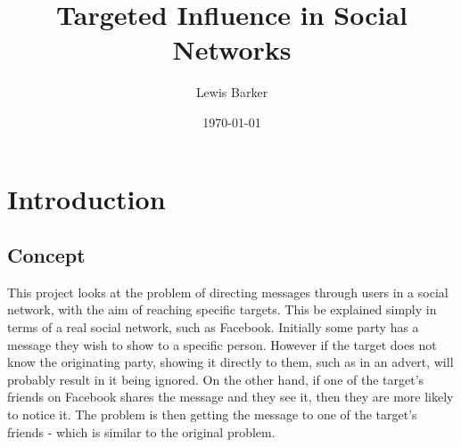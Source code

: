 \documentclass[bsc,frontabs,twoside,singlespacing,parskip,deptreport]{infthesis}     %
\begin{document}
\title{Targeted Influence in Social Networks}

\author{Lewis Barker}



\date{\today}

\abstract{

}

\maketitle

\tableofcontents



\chapter{Introduction}
\section{Concept}
This project looks at the problem of directing messages through users in a social network, with the aim of reaching specific targets. This be explained simply in terms of a real social network, such as Facebook. Initially some party has a message they wish to show to a specific person. However if the target does not know the originating party, showing it directly to them, such as in an advert, will probably result in it being ignored. On the other hand, if one of the target's friends on Facebook shares the message and they see it, then they are more likely to notice it. The problem is then getting the message to one of the target's friends - which is similar to the original problem.
\end{document}
